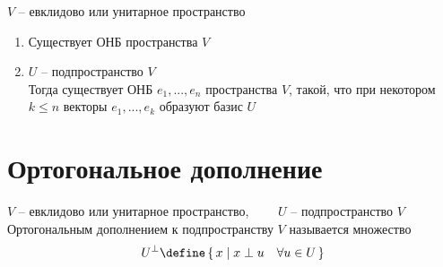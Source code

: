 \begin{implication}
	$ V $ -- евклидово или унитарное пространство
	\begin{enumerate}
		\item Существует ОНБ пространства $ V $
		\item $ U $ -- подпространство $ V $ \\
		Тогда существует ОНБ $ e_1, ..., e_n $ пространства $ V $, такой, что при некотором $ k \le n $ векторы $ e_1, ..., e_k $ образуют базис $ U $
	\end{enumerate}
\end{implication}

\section{Ортогональное дополнение}

\begin{definition}
	$ V $ -- евклидово или унитарное пространство, $ \qquad U $ -- подпространство $ V $ \\
	Ортогональным дополнением к подпространству $ V $ называется множество
	$$ U^\perp \define \set{x | x \perp u \quad \forall u \in U} $$
\end{definition}

